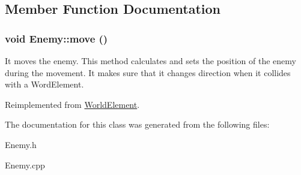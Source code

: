 \subsection{Member Function Documentation}
\hypertarget{classEnemy_a9a398f8d12234f02563b27440aff7891}{
\subsubsection[{move}]{\setlength{\rightskip}{0pt plus 5cm}void Enemy::move ()}}
\label{classEnemy_a9a398f8d12234f02563b27440aff7891}


It moves the enemy. This method calculates and sets the position of the enemy during the movement. It makes sure that it changes direction when it collides with a WordElement. 

Reimplemented from \hyperlink{classWorldElement}{WorldElement}.

The documentation for this class was generated from the following files:\begin{DoxyCompactItemize}
\item 
Enemy.h\item 
Enemy.cpp\end{DoxyCompactItemize}
